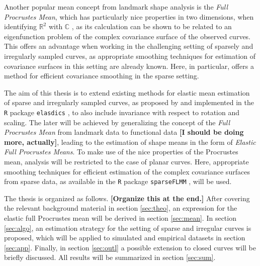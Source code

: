 Another popular mean concept from landmark shape analysis is the \textit{Full Procrustes Mean}, which has particularly nice properties in two dimensions, when identifying $\mathbb{R}^2$ with $\mathbb{C}$ \parencite[see][Chap.\ 8]{DrydenMardia2016}, as its calculation can be shown to be related to an eigenfunction problem of the complex covariance surface of the observed curves.
This offers an advantage when working in the challenging setting of sparsely and irregularly sampled curves, as appropriate smoothing techniques for estimation of covariance surfaces in this setting are already known.
Here, in particular, \cite{CederbaumScheiplGreven2018} offers a method for efficient covariance smoothing in the sparse setting. 

The aim of this thesis is to extend existing methods for elastic mean estimation of sparse and irregularly sampled curves, as proposed by \cite{Steyer2021} and implemented in the \texttt{R} package \texttt{elasdics} \parencite{elasdics}, to also include invariance with respect to rotation and scaling.
The later will be achieved by generalizing the concept of the \textit{Full Procrustes Mean} from landmark data to functional data \textbf{[I should be doing more, actually]}, leading to the estimation of shape means in the form of \textit{Elastic Full Procrustes Means}.
To make use of the nice properties of the Procrustes mean, analysis will be restricted to the case of planar curves.
Here, appropriate smoothing techniques for efficient estimation of the complex covariance surfaces from sparse data, as available in the \texttt{R} package \texttt{sparseFLMM} \parencite{sparseFLMM}, will be used.

The thesis is organized as follows. 
\textbf{[Organize this at the end.]}
After covering the relevant background material  in section \ref{sec:theo}, an expression for the elastic full Procrustes mean will be derived in section \ref{sec:mean}.
In section \ref{sec:algo}, an estimation strategy for the setting of sparse and irregular curves is proposed, which will be applied to simulated and empirical datasets in section \ref{sec:app}.
Finally, in section \ref{sec:outl} a possible extension to closed curves will be briefly discussed.
All results will be summarized in section \ref{sec:sum}.

\newpage
